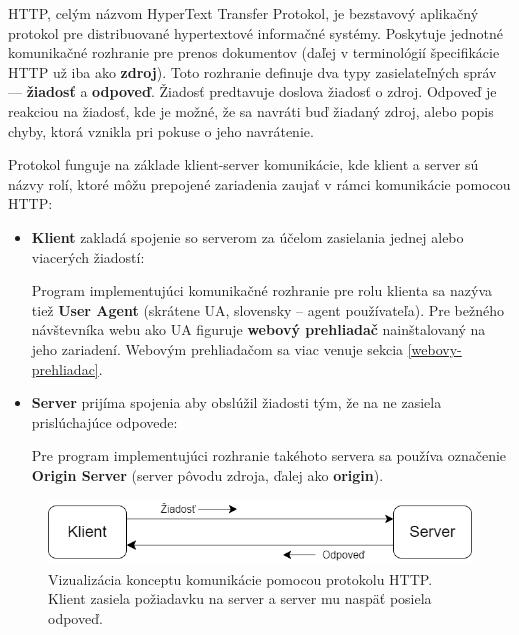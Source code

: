 HTTP, celým názvom HyperText Transfer Protokol, je bezstavový aplikačný protokol pre distribuované hypertextové informačné systémy. 
Poskytuje jednotné komunikačné rozhranie pre prenos dokumentov (daľej v terminológií špecifikácie HTTP už iba ako \textbf{zdroj}).
Toto rozhranie definuje dva typy zasielateľných správ --- \textbf{žiadosť} a \textbf{odpoveď}. Žiadosť predtavuje doslova žiadosť o zdroj. Odpoveď je reakciou na žiadosť, kde je možné, že sa navráti buď žiadaný zdroj, alebo popis chyby, ktorá vznikla pri pokuse o jeho navrátenie. 

Protokol funguje na základe klient-server komunikácie, kde klient a server sú názvy rolí, ktoré môžu prepojené zariadenia zaujať v rámci komunikácie pomocou HTTP:
\begin{itemize}
    \item \textbf{Klient} zakladá spojenie so serverom za účelom zasielania jednej alebo viacerých \mbox{žiadostí}: 
    
    Program implementujúci komunikačné rozhranie pre rolu klienta sa nazýva tiež \textbf{User Agent} (skrátene UA, slovensky -- agent používateľa). Pre bežného návštevníka webu ako UA \mbox{figuruje} \textbf{webový prehliadač} nainštalovaný na jeho zariadení. Webovým prehliadačom sa viac venuje sekcia \ref{webovy-prehliadac}.
    
    \item \textbf{Server} prijíma spojenia aby obslúžil žiadosti tým, že na ne zasiela prislúchajúce odpovede:

    Pre program implementujúci rozhranie takéhoto servera sa používa označenie \textbf{Origin Server} (server pôvodu zdroja, ďalej ako \textbf{origin}).
\end{itemize}

\begin{figure}[htb]
\begin{center}
    \includegraphics[scale=0.6]{obrazky-figures/http-client-server.png}
    \caption{\centering Vizualizácia konceptu komunikácie pomocou protokolu HTTP. Klient zasiela požiadavku na server a server mu naspäť posiela odpoveď.}
    \label{fig:http-client-server}
\end{center}
\end{figure}

